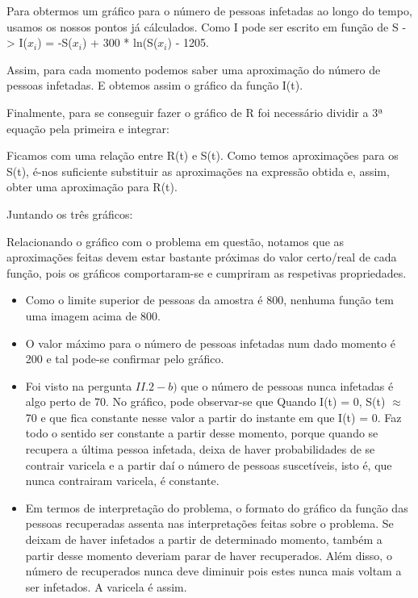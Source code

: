 \documentclass[portuguese, a4paper]{article}
\begin{document}
		Para obtermos um gráfico para o número de pessoas infetadas ao longo do tempo, usamos os nossos
		pontos já cálculados.
		Como I pode ser escrito em função de S ->
		I($x_i$) = -S($x_i$) + 300 * ln(S($x_i$) - 1205.
		
		Assim, para cada momento podemos saber uma aproximação do número de pessoas infetadas. E obtemos assim
		o gráfico da função I(t).
		
		Finalmente, para se conseguir fazer o gráfico de R foi necessário dividir a 3ª equação pela primeira e integrar:
		
		Ficamos com uma relação entre R(t) e S(t). Como temos aproximações para os S(t), 
		é-nos suficiente substituir as aproximações na expressão obtida e, assim, obter uma aproximação para R(t).
		
		Juntando os três gráficos:
		
		
		Relacionando o gráfico com o problema em questão, notamos que as aproximações feitas devem estar
		bastante próximas do valor certo/real de cada função, pois os gráficos comportaram-se e cumpriram as respetivas propriedades.
		
		
		\begin{itemize}
		\item Como o limite superior de pessoas da amostra é 800, nenhuma função tem uma imagem acima de 800.
		\item O valor máximo para o número de pessoas infetadas num dado momento é 200 e tal pode-se confirmar pelo gráfico.
		\item Foi visto na pergunta $II.2-b)$ que o número de pessoas nunca infetadas é algo perto de 70. %
		No gráfico, pode observar-se que Quando I(t) = 0, S(t) $\approx$ 70 e que fica constante nesse valor a partir do instante em que I(t) = 0.
		Faz todo o sentido ser constante a partir desse momento, porque quando se recupera a última pessoa infetada, deixa de haver probabilidades
		de se contrair varicela e a partir daí o número de pessoas suscetíveis, isto é, que nunca contrairam varicela, é constante.
		\item Em termos de interpretação do problema, o formato do gráfico da função das pessoas recuperadas assenta nas interpretações
		feitas sobre o problema.
		Se deixam de haver infetados a partir de determinado momento, 
		também a partir desse momento deveriam parar de haver recuperados.
		Além disso, o número de recuperados nunca deve diminuir pois estes nunca mais voltam a ser infetados. A varicela é assim.
		\end{itemize}
		
\end{document}
